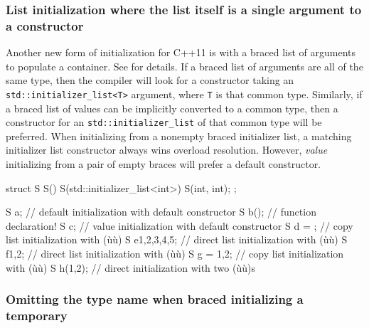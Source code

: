 \subsubsection[List initialization where the list itself is a single argument to a constructor]{List initialization where the list itself is a single argument to a constructor}\label{list-initialization-where-the-list-itself-is-a-single-argument-to-a-constructor}

Another new form of initialization for C++11 is  with a braced list of arguments to populate a container.
See  for details. If a braced list of arguments are
all of the same type, then the compiler will look for a constructor
taking an \lstinline!std::initializer_list<T>! argument, where \lstinline!T!
is that common type. Similarly, if a braced list of values can be
implicitly converted to a common type, then a constructor for an
\lstinline!std::initializer_list! of that common type will be preferred.
When initializing from a nonempty braced initializer list, a matching
initializer list constructor always wins overload resolution. However,
\emph{value} initializing from a pair of empty braces will prefer a
default constructor.

\begin{emcppslisting}
struct S
{
  S() {}
  S(std::initializer_list<int>) {}
  S(int, int);
};

S a;             // default initialization with default constructor
S b();           // function declaration!
S c{};           // value initialization with default constructor
S d = {};        // copy list initialization with (ù{}ù)
S e{1,2,3,4,5};  // direct list initialization with (ù{}ù)
S f{1,2};        // direct list initialization with (ù{}ù)
S g = {1,2};     // copy list initialization with (ù{}ù)
S h(1,2);        // direct initialization with two (ù{}ù)s
\end{emcppslisting}


\subsubsection[Omitting the type name when braced initializing a temporary]{Omitting the type name when braced initializing a temporary}\label{omitting-the-type-name-when-braced-initializing-a-temporary}

